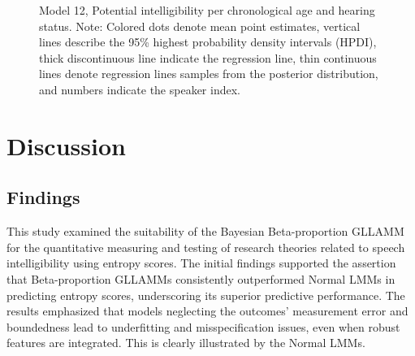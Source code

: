 \documentclass[
]{agujournal2019}
\begin{document}
\label{cell-fig-rq3-intelligibility-model12}
\begin{figure}[H]


\caption{\label{fig-rq3-intelligibility-model12}Model 12, Potential
intelligibility per chronological age and hearing status. Note: Colored
dots denote mean point estimates, vertical lines describe the 95\%
highest probability density intervals (HPDI), thick discontinuous line
indicate the regression line, thin continuous lines denote regression
lines samples from the posterior distribution, and numbers indicate the
speaker index.}

\end{figure}%

\section{Discussion}\label{sec-discussion}

\subsection{Findings}\label{sec-D-F}

This study examined the suitability of the Bayesian Beta-proportion
GLLAMM for the quantitative measuring and testing of research theories
related to speech intelligibility using entropy scores. The initial
findings supported the assertion that Beta-proportion GLLAMMs
consistently outperformed Normal LMMs in predicting entropy scores,
underscoring its superior predictive performance. The results emphasized
that models neglecting the outcomes' measurement error and boundedness
lead to underfitting and misspecification issues, even when robust
features are integrated. This is clearly illustrated by the Normal LMMs.
\end{document}
